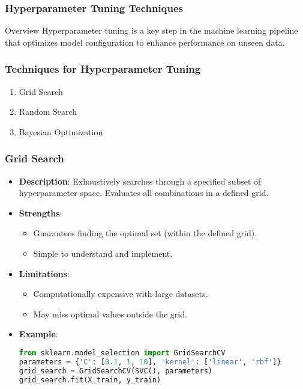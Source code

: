\documentclass{beamer}
\begin{document}
\begin{frame}
    \frametitle{Hyperparameter Tuning Techniques}
    \begin{block}{Overview}
        Hyperparameter tuning is a key step in the machine learning pipeline that optimizes model configuration to enhance performance on unseen data.
    \end{block}
\end{frame}

\begin{frame}
    \frametitle{Techniques for Hyperparameter Tuning}
    \begin{enumerate}
        \item \alert{Grid Search}
        \item \alert{Random Search}
        \item \alert{Bayesian Optimization}
    \end{enumerate}
\end{frame}

\begin{frame}[fragile]
    \frametitle{Grid Search}
    \begin{itemize}
        \item \textbf{Description}: Exhaustively searches through a specified subset of hyperparameter space. Evaluates all combinations in a defined grid.
        \item \textbf{Strengths}:
        \begin{itemize}
            \item Guarantees finding the optimal set (within the defined grid).
            \item Simple to understand and implement.
        \end{itemize}
        \item \textbf{Limitations}:
        \begin{itemize}
            \item Computationally expensive with large datasets.
            \item May miss optimal values outside the grid.
        \end{itemize}
        \item \textbf{Example}:
        \begin{lstlisting}[language=Python]
from sklearn.model_selection import GridSearchCV
parameters = {'C': [0.1, 1, 10], 'kernel': ['linear', 'rbf']}
grid_search = GridSearchCV(SVC(), parameters)
grid_search.fit(X_train, y_train)
        \end{lstlisting}
    \end{itemize}
\end{frame}
\end{document}
